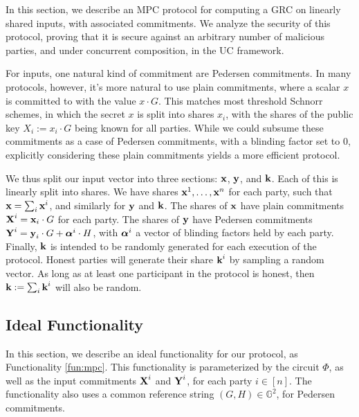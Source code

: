 In this section, we describe an MPC protocol for computing
a GRC on linearly shared inputs, with associated commitments.
We analyze the security of this protocol, proving that it
is secure against an arbitrary number of malicious parties,
and under concurrent composition, in the UC framework.

For inputs, one natural kind of commitment are Pedersen commitments.
In many protocols, however, it's more natural to use plain commitments,
where a scalar $x$ is committed to with the value $x \cdot G$.
This matches most threshold Schnorr schemes,
in which the secret $x$ is split into shares $x_i$, with the shares
of the public key $X_i := x_i \cdot G$ being known for all parties.
While we could subsume these commitments as a case of Pedersen commitments,
with a blinding factor set to $0$, explicitly considering these
plain commitments yields a more efficient protocol.

We thus split our input vector into three sections: $\textbf{x}$, $\textbf{y}$, and $\textbf{k}$.
Each of this is linearly split into shares.
We have shares $\textbf{x}^1, \ldots, \textbf{x}^n$ for each party, such that $\textbf{x} = \sum_i \textbf{x}^i$,
and similarly for $\textbf{y}$ and $\textbf{k}$.
The shares of $\textbf{x}$ have plain commitments $\textbf{X}^i = \textbf{x}_i \cdot G$
for each party.
The shares of $\textbf{y}$ have Pedersen commitments $\textbf{Y}^i = \textbf{y}_i \cdot G + \boldsymbol{\alpha}^i \cdot H$,
with $\boldsymbol{\alpha}^i$ a vector of blinding factors held by each party.
Finally, $\textbf{k}$ is intended to be randomly generated for each execution
of the protocol.
Honest parties will generate their share $\textbf{k}^i$ by sampling a random
vector.
As long as at least one participant in the protocol is honest,
then $\textbf{k} := \sum_i \textbf{k}^i$ will also be random.

\subsection{Ideal Functionality}
\label{sec:idealfunc}
In this section, we describe an ideal functionality for our protocol,
as Functionality \ref{fun:mpc}.
This functionality is parameterized by the circuit $\Phi$,
as well as the input commitments $\textbf{X}^i$ and $\textbf{Y}^i$, for each party
$i \in [n]$.
The functionality also uses a common reference string $(G, H) \in \mathbb{G}^2$,
for Pedersen commitments.

